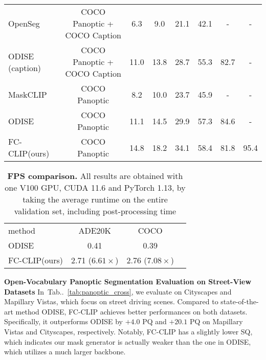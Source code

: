 \documentclass{article}
\makeatletter
\DeclareRobustCommand\onedot{\futurelet\@let@token\@onedot}
\def\@onedot{\ifx\@let@token.\else.\null\fi\xspace}
\newcommand{\tabref}[1]{Tab\onedot~\ref{#1}}
\newcommand{\modelname}{FC-CLIP\xspace}
\newcommand{\tablestyle}[2]{\setlength{\tabcolsep}{#1}\renewcommand{\arraystretch}{#2}\centering\footnotesize}
\makeatother
\begin{document}
\begin{table*}[!t]
\begin{tabular}{l|c|cccccc}
\hline
OpenSeg~\cite{ghiasi2022scaling}      & COCO Panoptic + COCO Caption          & 6.3           & 9.0           & 21.1          & 42.1          & -         & -       \\
ODISE~\cite{xu2023open} (caption)        & COCO Panoptic + COCO Caption      & 11.0 & 13.8 & 28.7 & 55.3 & 82.7   & -  \\
\hline
MaskCLIP~\cite{ding2022open}       & COCO Panoptic              & 8.2           & 10.0          & 23.7          & 45.9          & -         & -     \\
ODISE~\cite{xu2023open}        & COCO Panoptic            & 11.1 & 14.5 & 29.9 & 57.3 & 84.6   & -  \\
\hline \hline
\modelname (ours)        & COCO Panoptic      & 14.8 & 18.2 & 34.1 & 58.4 & 81.8   & 95.4  \\
\end{tabular}

\end{table*}


\begin{table}[!t]
\tablestyle{6pt}{1.1}
\caption{
\textbf{FPS comparison.} All results are obtained with one V100 GPU, CUDA 11.6 and PyTorch 1.13, by taking the average runtime on the entire validation set, including post-processing time
}
\label{tab:fps_comp}

\begin{tabular}{l|ccc}
   method                    & ADE20K            & COCO            \\
   \shline
   ODISE~\cite{xu2023open} & 0.41 & 0.39   \\
   \hline \hline


   \modelname (ours)  & 2.71 ($6.61\times$) & 2.76 ($7.08\times$)
\end{tabular}
\end{table}


\noindent \textbf{Open-Vocabulary Panoptic Segmentation Evaluation on Street-View Datasets}\quad
In~\tabref{tab:panoptic_cross}, we evaluate on Cityscapes and Mapillary Vistas, which focus on street driving scenes.
Compared to state-of-the-art method ODISE, \modelname achieves better performances on both datasets. Specifically, it outperforms ODISE by $+4.0$ PQ and $+20.1$ PQ on Mapillary Vistas and Cityscapes, respectively.
Notably, \modelname has a slightly lower SQ, which indicates our mask generator is actually weaker than the one in ODISE, which utilizes a much larger backbone.
\end{document}
